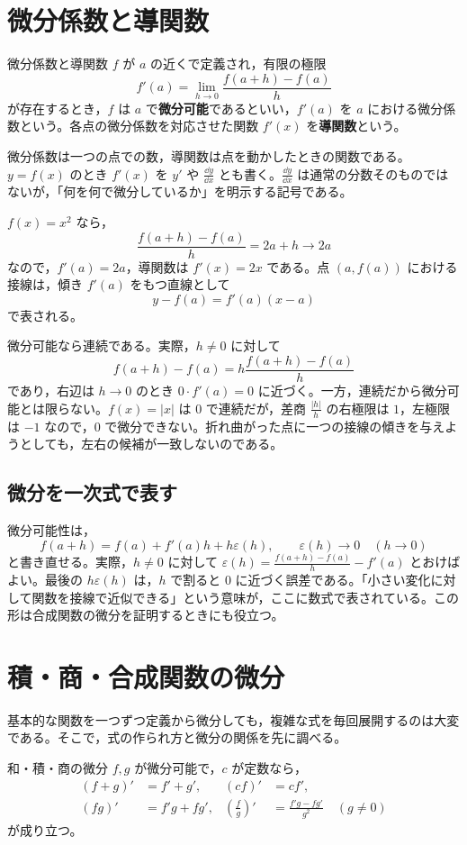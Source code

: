 \section{微分係数と導関数}\label{節:微分定義}
\begin{definition}{微分係数と導関数}
$f$ が $a$ の近くで定義され，有限の極限
\[
 f'(a)=\lim_{h\to0}\frac{f(a+h)-f(a)}h
\]
が存在するとき，$f$ は $a$ で\textbf{微分可能}であるといい，$f'(a)$ を $a$ における微分係数という。各点の微分係数を対応させた関数 $f'(x)$ を\textbf{導関数}という。
\end{definition}

微分係数は一つの点での数，導関数は点を動かしたときの関数である。$y=f(x)$ のとき $f'(x)$ を $y'$ や $\frac{\dd y}{\dd x}$ とも書く。$\frac{\dd y}{\dd x}$ は通常の分数そのものではないが，「何を何で微分しているか」を明示する記号である。

$f(x)=x^2$ なら，
\[
 \frac{f(a+h)-f(a)}h=2a+h\longrightarrow2a
\]
なので，$f'(a)=2a$，導関数は $f'(x)=2x$ である。点 $(a,f(a))$ における接線は，傾き $f'(a)$ をもつ直線として
\[
 y-f(a)=f'(a)(x-a)
\]
で表される。

微分可能なら連続である。実際，$h\ne0$ に対して
\[
 f(a+h)-f(a)
 =h\frac{f(a+h)-f(a)}h
\]
であり，右辺は $h\to0$ のとき $0\cdot f'(a)=0$ に近づく。一方，連続だから微分可能とは限らない。$f(x)=|x|$ は $0$ で連続だが，差商 $\frac{|h|}{h}$ の右極限は $1$，左極限は $-1$ なので，$0$ で微分できない。折れ曲がった点に一つの接線の傾きを与えようとしても，左右の候補が一致しないのである。

\subsection{微分を一次式で表す}
微分可能性は，
\[
 f(a+h)=f(a)+f'(a)h+h\varepsilon(h),
 \qquad \varepsilon(h)\to0\quad(h\to0)
\]
と書き直せる。実際，$h\ne0$ に対して $\varepsilon(h)=\frac{f(a+h)-f(a)}h-f'(a)$ とおけばよい。最後の $h\varepsilon(h)$ は，$h$ で割ると $0$ に近づく誤差である。「小さい変化に対して関数を接線で近似できる」という意味が，ここに数式で表されている。この形は合成関数の微分を証明するときにも役立つ。

\section{積・商・合成関数の微分}\label{節:微分法則}
基本的な関数を一つずつ定義から微分しても，複雑な式を毎回展開するのは大変である。そこで，式の作られ方と微分の関係を先に調べる。

\begin{theorem}{和・積・商の微分}
$f,g$ が微分可能で，$c$ が定数なら，
\begin{align*}
 (f+g)'&=f'+g',& (cf)'&=cf',\\
 (fg)'&=f'g+fg',&
 \left(\frac fg\right)'&=\frac{f'g-fg'}{g^2}\quad(g\ne0)
\end{align*}
が成り立つ。
\end{theorem}

